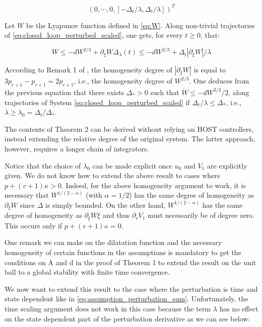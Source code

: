 \begin{equation}
     (0, \cdots, 0, [-\Delta_t/\lambda, \Delta_t/\lambda])^T
\end{equation}

Let \(W\) be the Lyapunov function defined in \ref{eq:W}. Along non-trivial trajectories 
of \ref{eq:closed_loop_perturbed_scaled}, one gets, for every \(t \geq 0\), that:

\begin{equation}
    \dot{W} \leq -dW^{2/3} + \partial_{\xi}W \dot{\Delta}_{\lambda}(t) \leq -dW^{2/3} + \Delta_t|\partial_{\xi}W|/\lambda
\end{equation}

According to Remark 1 of \cite{Laghrouche2017}, the homogeneity degree of \(|\partial_{\xi}W|\) is equal 
to \(3p_{r+1} - p_{r+1} = 2p_{r+1}\), i.e., the homogeneity degree of \(W^{2/3}\). One deduces from 
the previous equation that there exists \(\Delta_* > 0\) such that \(\dot{W} \leq -dW^{2/3}/2\), along 
trajectories of System \ref{eq:closed_loop_perturbed_scaled} if \(\Delta_t/\lambda \leq \Delta_*\), 
i.e., \(\lambda \geq \lambda_0 = \Delta_t/\Delta_*\).

The contents of Theorem 2 can be derived without relying on HOST controllers, instead extending the 
relative degree of the original system. The latter approach, however, requires a longer chain of integrators.

Notice that the choice of \(\lambda_0\) can be made explicit once \(u_0\) and \(V_1\) are explicitly 
given. We do not know how to extend the above result to cases where \(p+(r+1)\kappa>0\). Indeed, for the 
above homogeneity argument to work, it is necessary that \(W^{1/(2-\alpha)}\) (with \(\alpha=1/2\)) has the 
same degree of homogeneity as \(\partial_{\xi}W\) since \(\dot{\Delta}\) is simply bounded. On the other 
hand, \(W^{1/(2-\alpha)}\) has the same degree of homogeneity as \(\partial_{\xi}W \xi\) and 
thus \(\partial_r V_1\) must necessarily be of degree zero. This occurs only if \(p+(r+1)\kappa=0\).

One remark we can make on the dilatation function and the necessary homogeneity of certain functions in the
assumptions is mandatory to get the conditions on A and d in the proof of Theorem 1 to extend the result
on the unit ball to a global stability with finite time convergence.

We now want to extend this result to the case where the perturbation is time and state dependent like in 
\ref{eq:assumption_perturbation_sum}. Unfortunately, the time scaling argument does not work in this case
because the term \(\lambda\) has no effect on the state dependent part of the perturbation derivative as 
we can see below:

